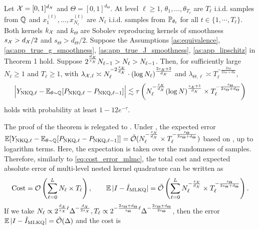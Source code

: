 \begin{thm}\label{thm:level_nkq}
Let $\mathcal{X} = [0,1]^{d_{\mathcal{X}}}$ and $\Theta = [0,1]^{d_\Theta}$. 
At level $\ell \geq 1$, $\theta_1, \ldots, \theta_{T_\ell}$ are $T_\ell$ i.i.d. samples from $\mathbb{Q}$ and $x_1^{(t)}, \ldots, x_{N_\ell}^{(t)}$ are $N_\ell$ i.i.d. samples from $\mathbb{P}_{\theta_t}$ for all $t \in \{1, \cdots, T_\ell \}$. 
Both kernels $k_{\mathcal{X}}$ and $k_\Theta$ are Sobolev reproducing kernels of smoothness $s_{\mathcal{X}} > d_{\mathcal{X}} / 2$ and $s_\Theta > d_\Theta/2$.
Suppose the Assumptions \ref{as:equivalence}, \ref{as:app_true_g_smoothness}, \ref{as:app_true_J_smoothness}, \ref{as:app_lipschitz} in Theorem 1 hold.
Suppose $2^{\frac{d_{\mathcal{X}}}{s_{\mathcal{X}}}} N_{\ell - 1} > N_\ell > N_{\ell - 1}$. 
Then, for sufficiently large $N_\ell \geq 1$ and $T_\ell \geq 1$, with $\lambda_{\mathcal{X}, \ell} \asymp N_\ell^{-2\frac{s_{\mathcal{X}}}{d_{\mathcal{X}}}} \cdot (\log N_\ell)^{\frac{2s_{\mathcal{X}}+2}{d_{\mathcal{X}}}}$ and $\lambda_{\Theta, \ell} \asymp T_\ell^{-\frac{2 s_\Theta}{2 s_\Theta +d_\Theta }}$,
\begin{align*}
    \Big| Y_{\text{NKQ}, \ell} - \operatorname{\mathbb{E}}_{\theta \sim \mathbb{Q}}[P_{\text{NKQ}, \ell} - P_{\text{NKQ}, \ell-1} ] \Big|  \lesssim \tau \left(  N_\ell^{- \frac{ s_{\mathcal{X}}}{d_{\mathcal{X}}}} (\log N)^{\frac{s_{\mathcal{X}}+1}{d_{\mathcal{X}}}} \times T_\ell^{-\frac{s_\Theta}{2 s_\Theta +d_\Theta }} \right)
\end{align*}
holds with probability at least $1 - 12 e^{-\tau}$. 
\end{thm}
The proof of the theorem is relegated to . 
Under , the expected error $\operatorname{\mathbb{E}}[Y_{\text{NKQ}, \ell} - \operatorname{\mathbb{E}}_{\theta \sim \mathbb{Q}}[P_{\text{NKQ}, \ell} - P_{\text{NKQ}, \ell-1} ] ] = \tilde{\mathcal{O}}(N_\ell^{-\frac{s_{\mathcal{X}}}{d_{\mathcal{X}}} } \times T_\ell^{-\frac{s_\Theta}{2 s_\Theta +d_\Theta }})$ based on , up to logarithm terms. 
Here, the expectation is taken over the randomness of samples.
Therefore, similarly to \eqref{eq:cost_error_mlmc}, the total cost and expected absolute error of multi-level nested kernel quadrature can be written as 
\begin{align}\label{eq:cost_error_mlnkq}
    \text{Cost} = \mathcal{O} \left(\sum_{\ell=0}^L N_\ell \times T_\ell\right), \qquad \operatorname{\mathbb{E}}|I - \hat{I}_{\text{MLKQ}}| = \tilde{\mathcal{O}}\left( \sum_{\ell=0}^L N_\ell^{-\frac{s_{\mathcal{X}}}{d_{\mathcal{X}}}} \times T_\ell^{-\frac{s_\Theta}{2 s_\Theta +d_\Theta }} \right).
\end{align}
If we take $N_\ell \propto 2^{ \frac{d_{\mathcal{X}}}{s_{\mathcal{X}}} \ell} \Delta^{-\frac{d_{\mathcal{X}}}{2 s_{\mathcal{X}}}}, T_\ell \propto 2^{- \frac{2 s_\Theta + d_\Theta}{s_\Theta} \ell} \Delta^{- \frac{2 s_\Theta + d_\Theta}{2 s_\Theta}}$, then the error $\operatorname{\mathbb{E}}|I - \hat{I}_{\text{MLKQ}}| = \tilde{\mathcal{O}}(\Delta)$ and the cost is 

